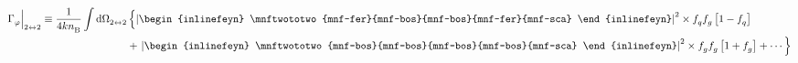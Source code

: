 \begin{align}
    \Gamma^{ }_\varphi\Big|^{ }_{2\leftrightarrow 2}\equiv\frac{1}{4k n^{ }_{\rm B}}
    \int {\rm d}\Omega^{ }_{2\leftrightarrow 2}&\left\{\left|\begin{inlinefeyn}
        \mnftwototwo{mnf-fer}{mnf-bos}{mnf-bos}{mnf-fer}{mnf-sca}
    \end{inlinefeyn}\right|^2\times f^{ }_q f^{ }_g\left[1-f^{ }_q\right]
    \right.\nonumber \\
    &+\left.\left|\begin{inlinefeyn}
        \mnftwototwo{mnf-bos}{mnf-bos}{mnf-bos}{mnf-bos}{mnf-sca}
    \end{inlinefeyn}\right|^2\times f^{ }_g f^{ }_g\left[1+f^{ }_g\right]
    +\cdots\right\}
\end{align}